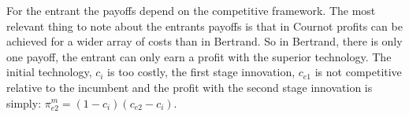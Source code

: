 








\begin{comment}\begin{tikzpicture}
    [%
        node distance =.8cm,
        place/.style={rectangle,draw=blue!50,fill=blue!20,thick,
                      inner sep=0pt,minimum size=6mm}
    ]%
    \node[place] (1) {$c_{e1}$};
    \node[place] (2) [right=of 1] {$c_{e2}$};
    
    \draw [->,thick] (1.south west) to [bend left=55]  node[left]  {(1-q)}    (1.north west);
    \draw [->,thick] (1.north east) to [bend left=15]  node[above] {q}  (2.north west);

\end{tikzpicture}
\end{comment}

For the entrant the payoffs depend on the competitive framework. The most relevant thing to note about the entrants payoffs is that in Cournot profits can be achieved for a wider array of costs than in Bertrand. So in Bertrand, there is only one payoff, the entrant can only earn a profit with the superior technology. The initial technology, $c_i$ is too costly, the first stage innovation, $c_{e1}$ is not competitive relative to the incumbent and the profit with the second stage innovation is simply: $\pi_{e2}^m=(1-c_i)(c_{e2}-c_i)$.